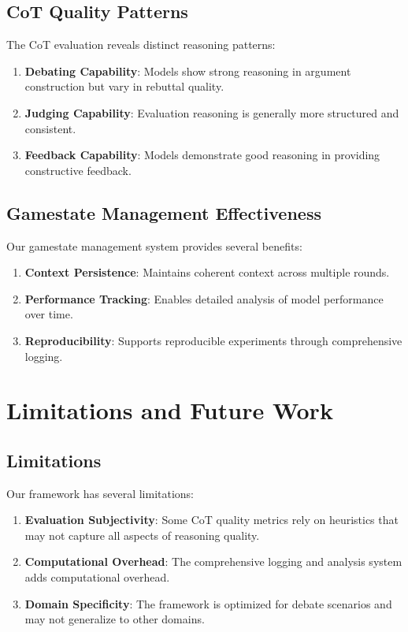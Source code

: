 \documentclass[11pt]{article}
\begin{document}
\subsection{CoT Quality Patterns}

The CoT evaluation reveals distinct reasoning patterns:

\begin{enumerate}
    \item \textbf{Debating Capability}: Models show strong reasoning in argument construction but vary in rebuttal quality.
    \item \textbf{Judging Capability}: Evaluation reasoning is generally more structured and consistent.
    \item \textbf{Feedback Capability}: Models demonstrate good reasoning in providing constructive feedback.
\end{enumerate}

\subsection{Gamestate Management Effectiveness}

Our gamestate management system provides several benefits:

\begin{enumerate}
    \item \textbf{Context Persistence}: Maintains coherent context across multiple rounds.
    \item \textbf{Performance Tracking}: Enables detailed analysis of model performance over time.
    \item \textbf{Reproducibility}: Supports reproducible experiments through comprehensive logging.
\end{enumerate}

\section{Limitations and Future Work}

\subsection{Limitations}

Our framework has several limitations:

\begin{enumerate}
    \item \textbf{Evaluation Subjectivity}: Some CoT quality metrics rely on heuristics that may not capture all aspects of reasoning quality.
    \item \textbf{Computational Overhead}: The comprehensive logging and analysis system adds computational overhead.
    \item \textbf{Domain Specificity}: The framework is optimized for debate scenarios and may not generalize to other domains.
\end{enumerate}
\end{document}
